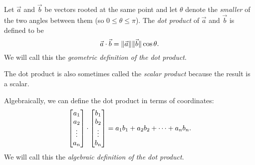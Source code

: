 Let $\vec a$ and $\vec b$ be vectors rooted at the same point and let
$\theta$ denote the \emph{smaller} of the
two angles between them (so $0\leq \theta \leq \pi$).
The \emph{dot product} of $\vec a$ and $\vec b$ is defined to be
\[
	\vec a\cdot \vec b=\lVert\vec a\rVert\lVert\vec b\rVert\cos \theta.
\]
We will call this the \emph{geometric definition of the dot product}.

\begin{center}
	\newcommand{\tikzAngleOfLine}{\tikz@AngleOfLine}
	  \def\tikz@AngleOfLine(#1)(#2)#3{%
	  \pgfmathanglebetweenpoints{%
	    \pgfpointanchor{#1}{center}}{%
	    \pgfpointanchor{#2}{center}}
	  \pgfmathsetmacro{#3}{\pgfmathresult}%
	  }
	\newcommand{\tikzMarkAngle}[3]{
	\tikzAngleOfLine#1#2{\AngleStart}
	\tikzAngleOfLine#1#3{\AngleEnd}
	\draw #1+(\AngleStart:0.35cm) arc (\AngleStart:\AngleEnd:0.35cm);
	}
	\usetikzlibrary{patterns,decorations.pathreplacing}
	\hspace{1cm}
\end{center}

The dot product is also sometimes called the \emph{scalar product} because
the result is a scalar.

Algebraically, we can define the dot product in terms of coordinates:
\[
	\begin{bmatrix}a_1\\a_2\\\vdots\\a_n\end{bmatrix}\cdot \begin{bmatrix}b_1\\b_2\\\vdots\\b_n\end{bmatrix}
	=a_1b_1+a_2b_2+\cdots+a_nb_n.
\]
We will call this the \emph{algebraic definition of the dot product}.

